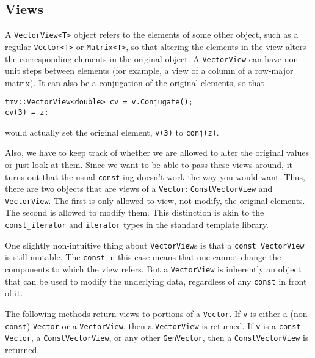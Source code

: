 \documentclass[twoside,letterpaper,11pt]{article}
\renewcommand{\tt}[1]{{\texttt {#1}}}
\begin{document}
\subsection{Views}
\label{VViews}

A \tt{VectorView<T>} object refers to the elements of some other object, such as a regular
\tt{Vector<T>} or \tt{Matrix<T>},
so that altering the elements in the view alters the
corresponding elements in the original object.  A \tt{VectorView}
can have non-unit
steps between elements (for example, a view of a column of a row-major
matrix).  It can also be a conjugation of the original
elements, so that
\begin{verbatim}
tmv::VectorView<double> cv = v.Conjugate();
cv(3) = z;
\end{verbatim}
would actually set the original element, \tt{v(3)} to \tt{conj(z)}. 

Also, we have to 
keep track of whether we are allowed to alter the original values or
just look at them.  
Since we want to be able to pass these views around, it turns out that
the usual \tt{const}-ing doesn't work the way you would want.
Thus, there are two objects that are views of a
\tt{Vector}:
\tt{ConstVectorView} and \tt{VectorView}.  
The first is only allowed to view,
not modify, the original elements.  The second is allowed to modify them.
This distinction is akin to the \tt{const\_iterator} and \tt{iterator} types in the
standard template library.

One slightly non-intuitive thing about \tt{VectorView}s is that a 
\tt{const VectorView} is still mutable.  The \tt{const} in this case
means that one cannot change the components to which the view refers.
But a \tt{VectorView} is inherently an object that can be used to 
modify the underlying data, regardless of any \tt{const} in front of it.

The following methods return views to portions of a \tt{Vector}.
If \tt{v} is either a (non-\tt{const}) \tt{Vector}
or a \tt{VectorView}, then a \tt{VectorView} is returned.
If \tt{v} is a \tt{const Vector}, a \tt{ConstVectorView}, or any other \tt{GenVector},
then a \tt{ConstVectorView} is returned.  
\end{document}
